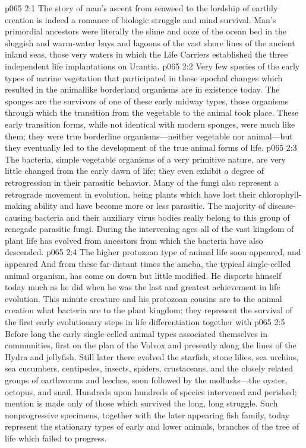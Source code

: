 \vs p065 2:1 The story of man’s ascent from seaweed to the lordship of earthly creation is indeed a romance of biologic struggle and mind survival. Man’s primordial ancestors were literally the slime and ooze of the ocean bed in the sluggish and warm\hyp{}water bays and lagoons of the vast shore lines of the ancient inland seas, those very waters in which the Life Carriers established the three independent life implantations on Urantia.
\vs p065 2:2 Very few species of the early types of marine vegetation that participated in those epochal changes which resulted in the animallike borderland organisms are in existence today. The sponges are the survivors of one of these early midway types, those organisms through which the  transition from the vegetable to the animal took place. These early transition forms, while not identical with modern sponges, were much like them; they were true borderline organisms---neither vegetable nor animal---but they eventually led to the development of the true animal forms of life.
\vs p065 2:3 The bacteria, simple vegetable organisms of a very primitive nature, are very little changed from the early dawn of life; they even exhibit a degree of retrogression in their parasitic behavior. Many of the fungi also represent a retrograde movement in evolution, being plants which have lost their chlorophyll\hyp{}making ability and have become more or less parasitic. The majority of disease\hyp{}causing bacteria and their auxiliary virus bodies really belong to this group of renegade parasitic fungi. During the intervening ages all of the vast kingdom of plant life has evolved from ancestors from which the bacteria have also descended.
\vs p065 2:4 The higher protozoan type of animal life soon appeared, and appeared  And from these far\hyp{}distant times the ameba, the typical single\hyp{}celled animal organism, has come on down but little modified. He disports himself today much as he did when he was the last and greatest achievement in life evolution. This minute creature and his protozoan cousins are to the animal creation what bacteria are to the plant kingdom; they represent the survival of the first early evolutionary steps in life differentiation together with 
\vs p065 2:5 Before long the early single\hyp{}celled animal types associated themselves in communities, first on the plan of the Volvox and presently along the lines of the Hydra and jellyfish. Still later there evolved the starfish, stone lilies, sea urchins, sea cucumbers, centipedes, insects, spiders, crustaceans, and the closely related groups of earthworms and leeches, soon followed by the mollusks---the oyster, octopus, and snail. Hundreds upon hundreds of species intervened and perished; mention is made only of those which survived the long, long struggle. Such nonprogressive specimens, together with the later appearing fish family, today represent the stationary types of early and lower animals, branches of the tree of life which failed to progress.
